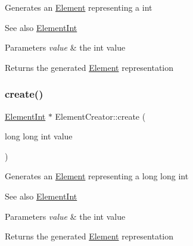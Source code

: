 Generates an \mbox{\hyperlink{classElement}{Element}} representing a int \begin{DoxySeeAlso}{See also}
\mbox{\hyperlink{classElementInt}{Element\+Int}}
\end{DoxySeeAlso}

\begin{DoxyParams}{Parameters}
{\em value} & the int value \\
\hline
\end{DoxyParams}
\begin{DoxyReturn}{Returns}
the generated \mbox{\hyperlink{classElement}{Element}} representation 
\end{DoxyReturn}
\mbox{\label{classElementCreator_ab7938321c7e51a63747c94b283ff2978}} 
\subsubsection{\texorpdfstring{create()}{create()}\hspace{0.1cm}{\footnotesize\ttfamily [2/6]}}
{\footnotesize\ttfamily \mbox{\hyperlink{classElementInt}{Element\+Int}} $\ast$ Element\+Creator\+::create (\begin{DoxyParamCaption}\item[{long long int}]{value }\end{DoxyParamCaption})\hspace{0.3cm}{\ttfamily [static]}}

Generates an \mbox{\hyperlink{classElement}{Element}} representing a long long int \begin{DoxySeeAlso}{See also}
\mbox{\hyperlink{classElementInt}{Element\+Int}}
\end{DoxySeeAlso}

\begin{DoxyParams}{Parameters}
{\em value} & the int value \\
\hline
\end{DoxyParams}
\begin{DoxyReturn}{Returns}
the generated \mbox{\hyperlink{classElement}{Element}} representation 
\end{DoxyReturn}
\mbox{\label{classElementCreator_a4654c6b5d2431bde10d9652146ad43a1}} 
